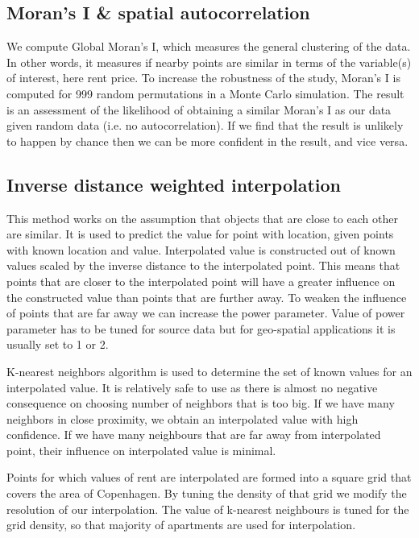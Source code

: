 \documentclass{article}
\begin{document}

\subsection{Moran's I \& spatial autocorrelation}

We compute Global Moran's I, which measures the general clustering of the data. In other words, it measures if nearby points are similar in terms of the variable(s) of interest, here rent price. To increase the robustness of the study, Moran's I is computed for 999 random permutations in a Monte Carlo simulation. The result is an assessment of the likelihood of obtaining a similar Moran's I as our data given random data (i.e. no autocorrelation). If we find that the result is unlikely to happen by chance then we can be more confident in the result, and vice versa. 

\subsection{Inverse distance weighted interpolation}
This method works on the assumption that objects that are close to each other are similar. It is used to predict the value for point with location, given points with known location and value. Interpolated value is constructed out of known values scaled by the inverse distance to the interpolated point. This means that points that are closer to the interpolated point will have a greater influence on the constructed value than points that are further away. To weaken the influence of points that are far away we can increase the power parameter. Value of power parameter has to be tuned for source data but for geo-spatial applications it is usually set to 1 or 2.

K-nearest neighbors algorithm is used to determine the set of known values for an interpolated value. It is relatively safe to use as there is almost no negative consequence on choosing number of neighbors that is too big. If we have many neighbors in close proximity, we obtain an interpolated value with high confidence. If we have many neighbours that are far away from interpolated point, their influence on interpolated value is minimal.

Points for which values of rent are interpolated are formed into a square grid that covers the area of Copenhagen. By tuning the density of that grid we modify the resolution of our interpolation. The value of k-nearest neighbours is tuned for the grid density, so that majority of apartments are used for interpolation. 
\end{document}
